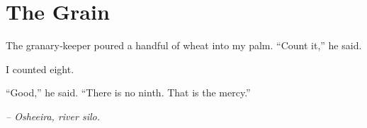 \chapter*{The Grain}

The granary‑keeper poured a handful of wheat into my palm. “Count it,” he said.

I counted eight.

“Good,” he said. “There is no ninth. That is the mercy.”

\smallskip

\noindent \textit{– Osheeira, river silo.}

